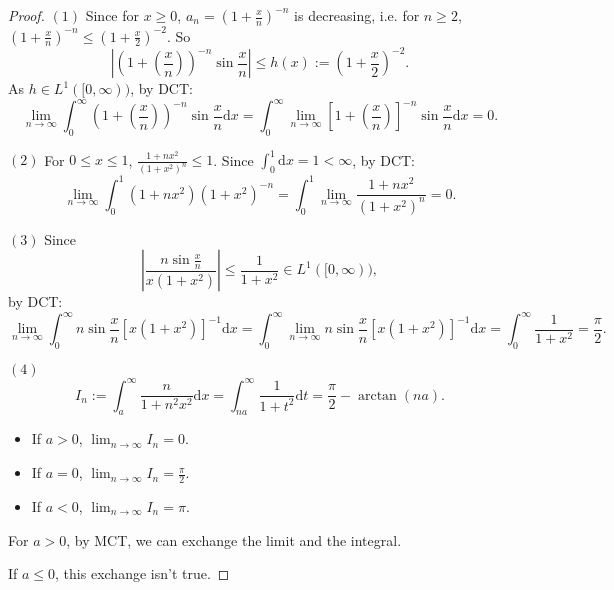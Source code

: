 \documentclass{article}
\newcommand{\dif}{\mathrm{d}}
\begin{document}
\begin{proof}
    $(1)$ Since for $x\ge 0$, 
    $a_{n}=(1+\frac{x}{n})^{-n}$ is decreasing, i.e. 
    for $n\ge 2$, $(1+\frac{x}{n})^{-n}\le(1+\frac{x}{2})^{-2}$. 
    So 
    \begin{displaymath}
        |(1+(\frac{x}{n}))^{-n}\sin\frac{x}{n}|\le 
        h(x):=(1+\frac{x}{2})^{-2}.
    \end{displaymath}
    As $h\in L^{1}([0,\infty))$, by DCT:
    \begin{displaymath}
        \lim_{n\rightarrow\infty}\int_{0}^{\infty}(1+(\frac{x}{n}))^{-n}
        \sin\frac{x}{n}\dif x
        =\int_{0}^{\infty}\lim_{n\rightarrow\infty}[1+(\frac{x}{n})]^{-n}
        \sin\frac{x}{n}\dif x
        =0.
    \end{displaymath}

    $(2)$ For $0\le x\le 1$, $\frac{1+nx^2}{(1+x^2)^n}\le 1$. Since 
    $\int_{0}^{1}\dif x=1<\infty$, by DCT:
    \begin{displaymath}
        \lim_{n\rightarrow\infty}\int_{0}^{1}(1+nx^2)(1+x^2)^{-n}
        =\int_{0}^{1}\lim_{n\rightarrow\infty}\frac{1+nx^2}{(1+x^2)^n}
        =0.
    \end{displaymath}

    $(3)$ Since 
    \begin{displaymath}
        \left|\frac{n\sin\frac{x}{n}}{x(1+x^2)}\right|\le
        \frac{1}{1+x^2}\in L^{1}([0,\infty)),
    \end{displaymath}
    by DCT:
    \begin{displaymath}
        \lim_{n\rightarrow\infty}\int_{0}^{\infty}n\sin\frac{x}{n}
        [x(1+x^{2})]^{-1}\dif x
        =\int_{0}^{\infty}\lim_{n\rightarrow\infty}n\sin\frac{x}{n}
        [x(1+x^2)]^{-1}\dif x
        =\int_{0}^{\infty}\frac{1}{1+x^2}=\frac{\pi}{2}.
    \end{displaymath}

    $(4)$ 
    \begin{displaymath}
        I_{n}:=\int_{a}^{\infty}\frac{n}{1+n^2x^2}\dif x
        =\int_{na}^{\infty}\frac{1}{1+t^2}\dif t
        =\frac{\pi}{2}-\arctan(na).
    \end{displaymath}
    \begin{itemize}
        \item If $a>0$, $\lim_{n\rightarrow\infty}I_{n}=0$.
        \item If $a=0$, $\lim_{n\rightarrow\infty}I_{n}=\frac{\pi}{2}$.
        \item If $a<0$, $\lim_{n\rightarrow\infty}I_{n}=\pi$.
    \end{itemize}
    For $a>0$, by MCT, we can exchange the limit and the integral.

    If $a\le 0$, this exchange isn't true.
\end{proof}
\end{document}
